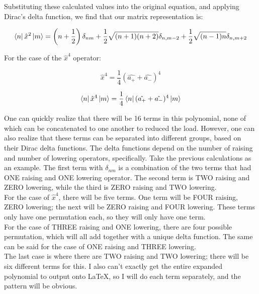 \documentclass[12pt]{article}
\begin{document}
Substituting these calculated values into the original equation, and applying Dirac's delta function, we find that our matrix representation is:

\begin{equation}
\bra{n} \hat{x}^2 \ket{m} = \left( n + \frac{1}{2} \right) \delta_{nm} +
							\frac{1}{2} \sqrt{(n+1)(n+2)} \delta_{n, m-2} +
							\frac{1}{2} \sqrt{(n-1) n} \delta_{n, m+2}
\end{equation}

For the case of the $\hat{x}^4$ operator:

\begin{equation}
\hat{x}^4 = \frac{1}{4} ( \hat{a_+} + \hat{a_-} )^4
\end{equation}

\begin{equation}
\bra{n} \hat{x}^4 \ket{m} = \frac{1}{4} \bra{n}( \hat{a_+} + \hat{a_-} )^4 \ket{m}
\end{equation}

One can quickly realize that there will be 16 terms in this polynomial, none of which can be concatenated to one another to reduced the load. However, one can also realize that these terms can be separated into different groups, based on their Dirac delta functions. The delta functions depend on the number of raising and number of lowering operators, specifically. Take the previous calculations as an example. The first term with $\delta_{nm}$ is a combination of the two terms that had ONE raising and ONE lowering operator. The second term is TWO raising and ZERO lowering, while the third is ZERO raising and TWO lowering. \\
							 
For the case of $\hat{x}^4$, there will be five terms. One term will be FOUR raising, ZERO lowering; the next will be ZERO raising and FOUR lowering. These terms only have one permutation each, so they will only have one term. \\

For the case of THREE raising and ONE lowering, there are four possible permutation, which will all add together with a unique delta function. The same can be said for the case of ONE raising and THREE lowering. \\

The last case is where there are TWO raising and TWO lowering; there will be six different terms for this. I also can't exactly get the entire expanded polynomial to output onto \LaTeX, so I will do each term separately, and the pattern will be obvious.
\end{document}
